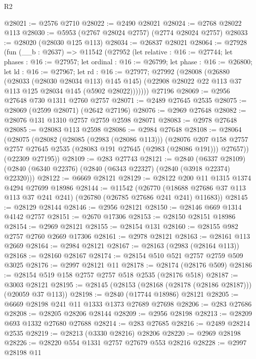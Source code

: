 \begin{lexlean}{R2}
\begin{coremodule}
@28021 := @2576 @2710
@28022 := @2490 @28021
@28024 := @2768 @28022 @113
@28030 := @5953 (@2767 @28024 @2757) (@2774 @28024 @2757)
@28033 := @28020 (@28030 @125 @113)
@28034 := @26837 @28021
@28064 := @27928
    (fun (__b : @2637) =>
    @11542
      (@27952
        (let relative : @16 := @27744;
        let phases : @16 := @27957;
        let ordinal : @16 := @26799;
        let phase : @16 := @26800;
        let ld : @16 := @27967;
        let rd : @16 := @27977;
        @27992
          (@28008
            (@26880
              (@28033 (@28030 @28034 @113) @145 @145)
              (@22908 @28022 @22 @113 @37 @113 @125 @28034 @145 (@5902 @28022)))))))
    @27196
@28069 := @2956 @27648 @730 @1311 @2760 @2757
@28071 := @2489 @27645 @2535
@28075 := @28069 (@2599 @28071) (@2642 @27196)
@28076 := @2969 @27648
@28082 := @28076 @131 @1310 @2757 @2759 @2598 @28071
@28083 := @2978 @27648
@28085 := @28083 @113 @2598
@28086 := @2984 @27648
@28108 := @28064
    (@28075
      (@28082
        (@28085 (@2983 (@28086 @113)))
        (@28076
          @207
          @158
          @2757
          @2757
          @27645
          @2535
          (@28083 @191 @27645 (@2983 (@28086 @191)))
          @27657))
      (@22309 @27195))
@28109 := @283 @27743
@28121 := @2840
    (@6337 @28109)
    (@2840 (@6340 @22376) (@2840 (@6343 @22327) (@2840 (@3918 @22374) @22320)))
@28122 := @6669 @28121
@28129 := @28122 @200 @11 @1315 @1374 @4294 @27699 @18986
@28144 := @11542
    (@26770 (@18688 @27686 @37 @113 @113 @37 @241 @241) (@26780 (@26785 @27686 @241 @241) @11683))
@28145 := @28129 @28144
@28146 := @2956 @28121
@28150 := @28146 @669 @1314 @4142 @2757
@28151 := @2670 @17306
@28153 := @28150 @28151 @18986
@28154 := @2969 @28121
@28155 := @28154 @131
@28160 := @28155 @982 @2757 @2760 @2669 @17306
@28161 := @2978 @28121
@28163 := @28161 @113 @2669
@28164 := @2984 @28121
@28167 := @28163 (@2983 (@28164 @113))
@28168 := @28160 @28167
@28174 := @28154 @510 @521 @2757 @2759 @509 @3025
@28176 := @2997 @28121 @11
@28178 := @28174 (@28176 @509)
@28186 := @28154 @519 @158 @2757 @2757 @518 @2535 (@28176 @518)
@28187 := @3003 @28121
@28195 := @28145 (@28153 (@28168 (@28178 (@28186 @28187))) (@20059 @37 @113))
@28198 := @2840 (@17744 @18986) @28121
@28205 := @6669 @28198 @241 @11 @1333 @1373 @27689 @27698
@28206 := @283 @27686
@28208 := @28205 @28206 @28144
@28209 := @2956 @28198
@28213 := @28209 @693 @1332 @27680 @27688
@28214 := @283 @27685
@28216 := @2489 @28214 @2535
@28219 := @28213 (@3330 @28216) @28206
@28220 := @2969 @28198
@28226 := @28220 @554 @1331 @2757 @27679 @553 @28216
@28228 := @2997 @28198 @11

\end{coremodule}
\end{lexlean}
